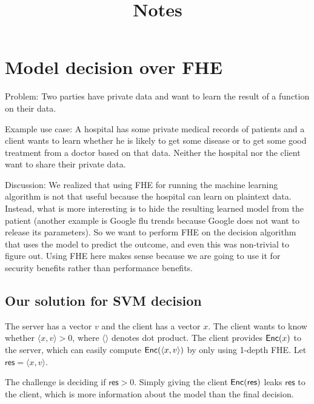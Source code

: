 \documentclass[11pt]{article}
\title{Notes}
\begin{document}
\date{}

\maketitle

\vspace{-2cm}


\section{Model decision over FHE}

Problem: Two parties have private data and want to learn the result of a function on their data.

\noindent Example use case:  A hospital  has some private medical records of patients and a client wants to learn whether he is likely to get some disease or to get some good treatment from a doctor based on that data. Neither the hospital nor the client want to share their private data.

Discussion:
We realized that using FHE for running the machine learning algorithm is not that useful because the hospital can learn on plaintext data. Instead, what is more interesting is to hide the resulting learned model from the patient (another example is Google flu trends because Google does not want to release its parameters). So we want to perform FHE on the decision algorithm that uses the model to predict the outcome, and even this was non-trivial to figure out.
Using FHE here makes sense because we are going to use it for security benefits rather than performance benefits.


\subsection{Our solution for SVM decision}

\newcommand{\res}{\mathsf{res}}

The server has a vector $v$ and the client has a vector $x$. The client wants to know whether $\langle x, v \rangle > 0$, where
$\langle \rangle$ denotes dot product.
The client provides $\mathsf{Enc}(x)$ to the server, which can easily compute $\mathsf{Enc}(\langle x, v \rangle)$ by only using 1-depth FHE. Let $\res = \langle x, v \rangle$.



The challenge is deciding if $\res > 0$. Simply giving the client $\enc(\res)$ leaks $\res$ to the client, which is more information about the model than the final decision.
\end{document}
